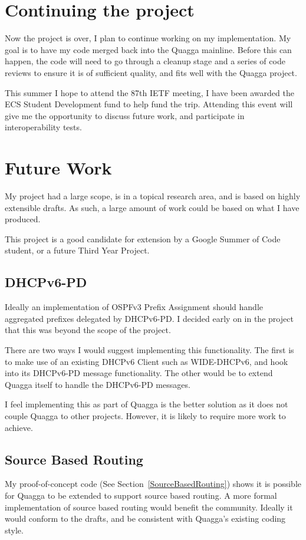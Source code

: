 \documentclass[12pt,a4paper,twoside]{report}
\begin{document}
\section{Continuing the project}
Now the project is over, I plan to continue working on my implementation. My
goal is to have my code merged back into the Quagga mainline. Before this can
happen, the code will need to go through a cleanup stage and a series of code
reviews to ensure it is of sufficient quality, and fits well with the Quagga
project.

This summer I hope to attend the 87th IETF meeting, I have been awarded
the ECS Student Development fund to help fund the trip. Attending this event
will give me the opportunity to discuss future work, and participate in
interoperability tests.

\section{Future Work}
My project had a large scope, is in a topical research area, and is based on
highly extensible drafts. As such, a large amount of work could be based on
what I have produced. 

This project is a good candidate for extension by a Google Summer of Code
student, or a future Third Year Project. 

\subsection{DHCPv6-PD}
Ideally an implementation of OSPFv3 Prefix Assignment should handle aggregated
prefixes delegated by DHCPv6-PD\@. I decided early on in the project that this
was beyond the scope of the project. 

There are two ways I would suggest implementing this functionality. The first
is to make use of an existing DHCPv6 Client such as WIDE-DHCPv6, and hook into
its DHCPv6-PD message functionality. The other would be to extend Quagga itself
to handle the DHCPv6-PD messages. 

I feel implementing this as part of Quagga is the better solution as it does
not couple Quagga to other projects. However, it is likely to require more work
to achieve.

\subsection{Source Based Routing} 
My proof-of-concept code (See Section~\ref{SourceBasedRouting}) shows it is
possible for Quagga to be extended to support source based routing. A more
formal implementation of source based routing would benefit the community.
Ideally it would conform to the drafts, and be consistent with Quagga's
existing coding style. 
\end{document}
